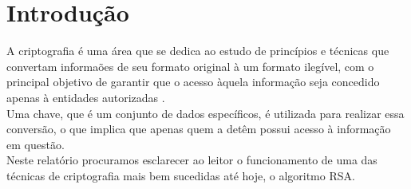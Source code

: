 \chapter[Introdução]{Introdução}
\label{chap:intro}
	A criptografia é uma área que se dedica ao estudo de princípios e técnicas que convertam informaões de seu formato original à um formato ilegível, com o principal objetivo de garantir que o acesso àquela informação seja concedido apenas à entidades autorizadas \cite{yaschenko}.
	\\ \indent Uma chave, que é um conjunto de dados específicos, é utilizada para realizar essa conversão, o que implica que apenas quem a detêm possui acesso à informação em questão.
	\\ \indent Neste relatório procuramos esclarecer ao leitor o funcionamento de uma das técnicas de criptografia mais bem sucedidas até hoje, o algoritmo RSA.